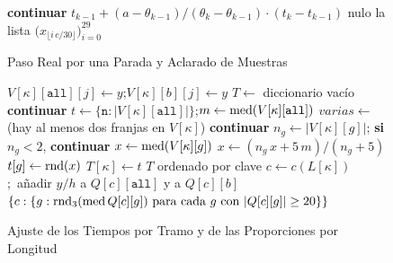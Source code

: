 \begin{figure}[ht]
\caption{Paso Real por una Parada y Aclarado de Muestras}\label{alg:paso-real}
\begin{algorithmic}[1]
     \textbf{continuar} \EndIf
      \State \Return $t_{k-1}+(a-\theta_{k-1})/(\theta_k-\theta_{k-1})\cdot(t_k-t_{k-1})$
    \EndIf
  \EndFor
  \State \Return nulo
\EndFunction
\Statex
{}
   \Return la lista \EndIf
  \State \Return $\big(x_{\lfloor i\,c/30\rfloor}\big)_{i=0}^{29}$ 
\EndFunction
\end{algorithmic}
\end{figure}

\begin{figure}[ht]
\caption{Ajuste de los Tiempos por Tramo y de las Proporciones por Longitud}\label{alg:ajuste-tramos}
\begin{algorithmic}[1]
    \State $V[\kappa][\texttt{all}][j]\gets y$;\quad $V[\kappa][b][j]\gets y$ 
  \EndFor
  \State $T\gets$ diccionario vacío
     \textbf{continuar} \EndIf
    \State $t\gets\{\texttt{n}:|V[\kappa][\texttt{all}]|\}$;\quad $m\gets\operatorname{med}(V[\kappa][\texttt{all}])$
    \State $\mathit{varias}\gets$ (hay al menos dos franjas en $V[\kappa]$)
       \textbf{continuar} \EndIf
      \State $n_g\gets|V[\kappa][g]|$; \textbf{si} $n_g<2$, \textbf{continuar}
      \State $x\gets\operatorname{med}(V[\kappa][g])$
       $x\gets(n_g\,x+5\,m)/(n_g+5)$ \EndIf
      \State $t[g]\gets\operatorname{rnd}(x)$
    \EndFor
     $T[\kappa]\gets t$ \EndIf
  \EndFor
  \State \Return $T$ ordenado por clave
\EndFunction
\Statex
{}
    \State $c\gets c(L[\kappa])$;\ añadir $y/h$ a $Q[c][\texttt{all}]$ y a $Q[c][b]$
  \EndFor
  \State \Return $\{c:\{g:\redondeo_3(\mediana Q[c][g])\ \text{para cada } g \text{ con } |Q[c][g]|\ge20\}\}$
\EndFunction
\end{algorithmic}
\end{figure}

